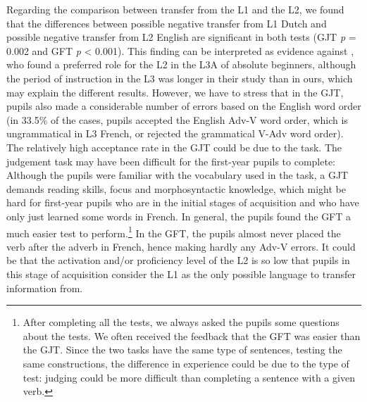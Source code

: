 \documentclass[output=paper,modfonts,nonflat, newtxmath]{langsci/langscibook}
\begin{document}
Regarding the comparison between transfer from the L1 and the L2, we found that the differences between possible negative transfer from L1 Dutch and possible negative transfer from L2 English are significant in both tests (GJT \textit{p} = 0.002 and GFT \textit{p} < 0.001). This finding can be interpreted as evidence against \citet{BardelFalk2007}, who found a preferred role for the L2 in the L3A of absolute beginners, although the period of instruction in the L3 was longer in their study than in ours, which may explain the different results. However, we have to stress that in the GJT, pupils also made a considerable number of errors based on the English word order (in 33.5\% of the cases, pupils accepted the English Adv-V word order, which is ungrammatical in L3 French, or rejected the grammatical V-Adv word order). The relatively high acceptance rate in the GJT could be due to the task. The judgement task may have been difficult for the first-year pupils to complete: Although the pupils were familiar with the vocabulary used in the task, a GJT demands reading skills, focus and morphosyntactic knowledge, which might be hard for first-year pupils who are in the initial stages of acquisition and who have only just learned some words in French. In general, the pupils found the GFT a much easier test to perform.\footnote{ \textrm{After completing all the tests, we always asked the pupils some questions about the tests. We often received the feedback that the GFT was easier than the GJT. Since the two tasks have the same type of sentences, testing the same constructions, the difference in experience could be due to the type of test: judging could be more difficult than completing a sentence with a given verb.} } In the GFT, the pupils almost never placed the verb after the adverb in French, hence making hardly any Adv-V errors. It could be that the activation and/or proficiency level of the L2 is so low that pupils in this stage of acquisition consider the L1 as the only possible language to transfer information from.
\end{document}
